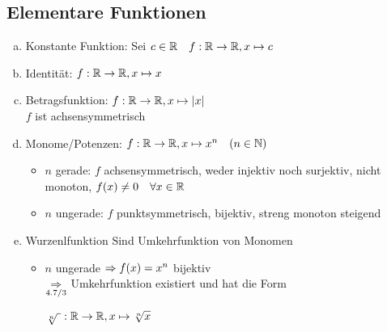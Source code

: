 \documentclass[10pt, a4paper, fleqn]{article}
\begin{document}
    \subsection{Elementare Funktionen}
    \begin{enumerate}[a)]
        \item Konstante Funktion: Sei $c \in \mathbb{R} \quad f: \mathbb{R} \to \mathbb{R}, x \mapsto c$
        \item Identität: $f: \mathbb{R} \to \mathbb{R}, x \mapsto x$
        \item Betragsfunktion: $f: \mathbb{R} \to \mathbb{R}, x \mapsto |x|$ \\ %
            $f$ ist achsensymmetrisch
        \item Monome/Potenzen: 
        $f: \mathbb{R} \to \mathbb{R}, x \mapsto x^n \quad (n \in \mathbb{N})$
        \begin{itemize}
            \item $n$ gerade: $f$ achsensymmetrisch, weder injektiv noch surjektiv, nicht
            monoton, $f(x) \neq 0 \quad \forall x \in \mathbb{R}$
            \item $n$ ungerade: $f$ punktsymmetrisch, bijektiv, streng monoton steigend
        \end{itemize}

        \item Wurzenlfunktion
        Sind Umkehrfunktion von Monomen
        \begin{itemize}
            \item $n$ ungerade
            $\Rightarrow f(x) = x^n$ bijektiv \\
            $\underset{4.7/3}{\Rightarrow}$ Umkehrfunktion existiert und hat die Form
            
            $\sqrt[n]{\ }: \mathbb{R} \to \mathbb{R}, x \mapsto \sqrt[n]{x}$
        \end{itemize}
    \end{enumerate}
\ifdefined\MAINDOC\else
\end{document}
